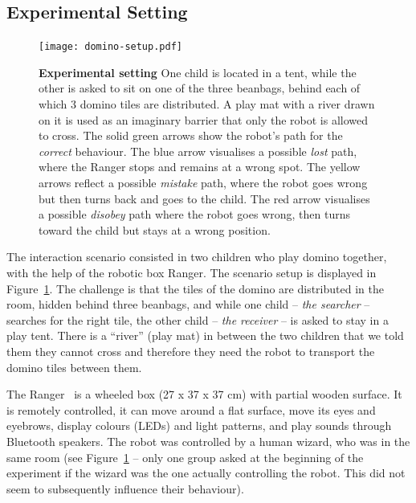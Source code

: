\documentclass{sig-alternate}
\begin{document}
\subsection{Experimental Setting}

\begin{figure}[ht!] 
    \centering 
    \texttt{[image: domino-setup.pdf]} 
    \caption{\small \textbf{Experimental setting} One child is located in a
        tent, while the other is asked to sit on one of the three beanbags,
        behind each of which 3 domino tiles are distributed. A play mat with a
        river drawn on it is used as an imaginary barrier that only the robot is
        allowed to cross. The solid green arrows show the robot's path for the
        \textit{correct} behaviour. The blue arrow visualises a possible
        \textit{lost} path, where the Ranger stops and remains at a wrong spot.
        The yellow arrows reflect a possible \textit{mistake} path, where the
        robot goes wrong but then turns back and goes to the child. The red
        arrow visualises a possible \textit{disobey} path where the robot goes
        wrong, then turns toward the child but stays at a wrong position.} 

    \label{fig:domino-setup} 
\end{figure}


The interaction scenario consisted in two children who play domino together,
with the help of the robotic box Ranger. The scenario setup is displayed in
Figure~\ref{fig:domino-setup}. The challenge is that the tiles of the domino are
distributed in the room, hidden behind three beanbags, and while one child --
\textit{the searcher} -- searches for the right tile, the other child --
\textit{the receiver} -- is asked to stay in a play tent. There is a ``river''
(play mat) in between the two children that we told them they cannot cross
and therefore they need the robot to transport the domino tiles between them.

The Ranger~\cite{mondada2014ranger} is a wheeled box (27 x 37 x 37 cm) with
partial wooden surface. It is remotely controlled, it can move around a flat
surface, move its eyes and eyebrows, display colours (LEDs) and light patterns,
and play sounds through Bluetooth speakers.  The robot was controlled by a human
wizard, who was in the same room (see Figure~\ref{fig:domino-setup} -- only one
group asked at the beginning of the experiment if the wizard was the one
actually controlling the robot. This did not seem to subsequently influence
their behaviour).
\end{document}

